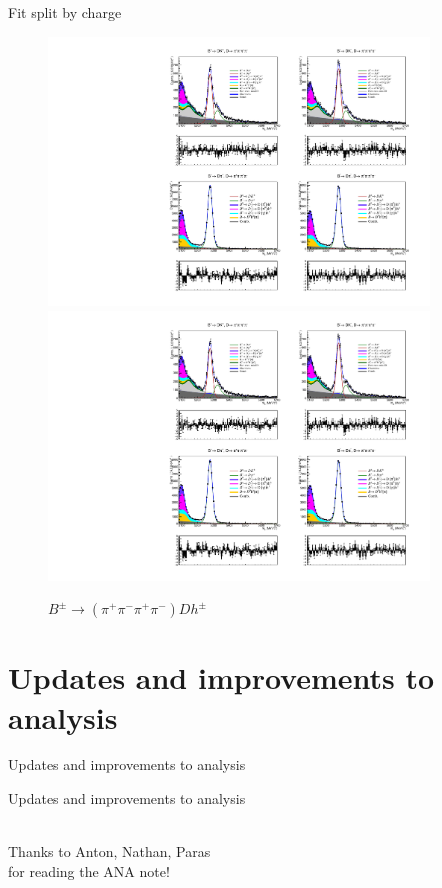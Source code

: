 \documentclass{beamer}
\begin{document}
\begin{frame}{Fit split by charge}
  \begin{figure}
    \centering
    \includegraphics[width = 0.9\textwidth, clip = true, trim = {0 12.9cm 0 0}]{Plots/d2pipipipi_fiveL_allDP_GLW.pdf}
    \includegraphics[width = 0.9\textwidth, clip = true, trim = {0 3cm 0 10cm}]{Plots/d2pipipipi_fiveL_allDP_GLW.pdf}
    \caption{$B^\pm\to (\pi^+\pi^-\pi^+\pi^-)Dh^\pm$}
  \end{figure}
\end{frame}

\section{Updates and improvements to analysis}
\begin{frame}{Updates and improvements to analysis}
  \begin{center}
    {\huge Updates and improvements to analysis}
  \end{center}
  \begin{center}
    \Large ~\\Thanks to Anton, Nathan, Paras\\for reading the ANA note!
  \end{center}
\end{frame}
\end{document}
